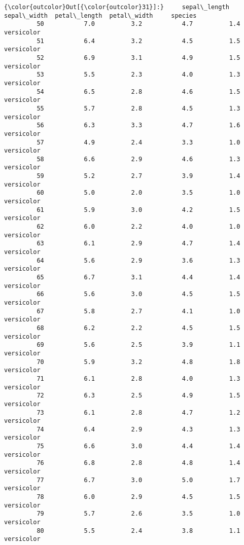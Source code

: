 \documentclass[11pt]{article}
\begin{document}
\begin{Verbatim}[commandchars=\\\{\}]
{\color{outcolor}Out[{\color{outcolor}31}]:}     sepal\_length  sepal\_width  petal\_length  petal\_width     species
         50           7.0          3.2           4.7          1.4  versicolor
         51           6.4          3.2           4.5          1.5  versicolor
         52           6.9          3.1           4.9          1.5  versicolor
         53           5.5          2.3           4.0          1.3  versicolor
         54           6.5          2.8           4.6          1.5  versicolor
         55           5.7          2.8           4.5          1.3  versicolor
         56           6.3          3.3           4.7          1.6  versicolor
         57           4.9          2.4           3.3          1.0  versicolor
         58           6.6          2.9           4.6          1.3  versicolor
         59           5.2          2.7           3.9          1.4  versicolor
         60           5.0          2.0           3.5          1.0  versicolor
         61           5.9          3.0           4.2          1.5  versicolor
         62           6.0          2.2           4.0          1.0  versicolor
         63           6.1          2.9           4.7          1.4  versicolor
         64           5.6          2.9           3.6          1.3  versicolor
         65           6.7          3.1           4.4          1.4  versicolor
         66           5.6          3.0           4.5          1.5  versicolor
         67           5.8          2.7           4.1          1.0  versicolor
         68           6.2          2.2           4.5          1.5  versicolor
         69           5.6          2.5           3.9          1.1  versicolor
         70           5.9          3.2           4.8          1.8  versicolor
         71           6.1          2.8           4.0          1.3  versicolor
         72           6.3          2.5           4.9          1.5  versicolor
         73           6.1          2.8           4.7          1.2  versicolor
         74           6.4          2.9           4.3          1.3  versicolor
         75           6.6          3.0           4.4          1.4  versicolor
         76           6.8          2.8           4.8          1.4  versicolor
         77           6.7          3.0           5.0          1.7  versicolor
         78           6.0          2.9           4.5          1.5  versicolor
         79           5.7          2.6           3.5          1.0  versicolor
         80           5.5          2.4           3.8          1.1  versicolor

\end{Verbatim}
\end{document}
